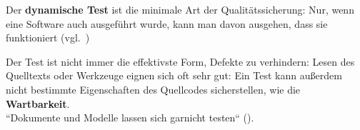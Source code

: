 \begin{tcolorbox}
    Der \textbf{dynamische Test} ist die minimale Art der Qualitätssicherung: Nur, wenn eine Software auch ausgeführt wurde, kann man davon ausgehen, dass sie funktioniert (vgl.~\cite[9]{Wed09c})
\end{tcolorbox}
\vspace{2mm}

\noindent
Der Test ist nicht immer die effektivste Form, Defekte zu verhindern: Lesen des Quelltexts oder Werkzeuge eignen sich oft sehr gut: Ein Test kann außerdem nicht bestimmte Eigenschaften des Quellcodes sicherstellen, wie die \textbf{Wartbarkeit}.\\
``Dokumente und Modelle lassen sich garnicht testen`` (\cite[10]{Wed09c}).
